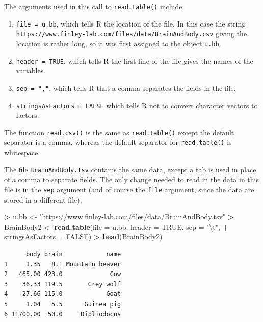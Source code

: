 \documentclass[
]{krantz}
\makeatletter
\newenvironment{Shaded}{\begin{snugshade}}{\end{snugshade}}
\newcommand{\CharTok}[1]{\textcolor[rgb]{0.5,0.5,0.5}{#1}}
\newcommand{\DataTypeTok}[1]{\textcolor[rgb]{0.27,0.27,0.27}{#1}}
\newcommand{\KeywordTok}[1]{\textcolor[rgb]{0.27,0.27,0.27}{\textbf{#1}}}
\newcommand{\NormalTok}[1]{#1}
\newcommand{\OperatorTok}[1]{\textcolor[rgb]{0.43,0.43,0.43}{\textbf{#1}}}
\newcommand{\OtherTok}[1]{\textcolor[rgb]{0.37,0.37,0.37}{#1}}
\newcommand{\StringTok}[1]{\textcolor[rgb]{0.5,0.5,0.5}{#1}}
\providecommand{\tightlist}{%
  \setlength{\itemsep}{0pt}\setlength{\parskip}{0pt}}
\newenvironment{kframe}{%
\medskip{}
\setlength{\fboxsep}{.8em}
 \def\at@end@of@kframe{}%
 \ifinner\ifhmode%
  \def\at@end@of@kframe{\end{minipage}}%
  \begin{minipage}{\columnwidth}%
 \fi\fi%
 \def\FrameCommand##1{\hskip\@totalleftmargin \hskip-\fboxsep
 \colorbox{shadecolor}{##1}\hskip-\fboxsep
     \hskip-\linewidth \hskip-\@totalleftmargin \hskip\columnwidth}%
 \MakeFramed {\advance\hsize-\width
   \@totalleftmargin\z@ \linewidth\hsize
   \@setminipage}}%
 {\par\unskip\endMakeFramed%
 \at@end@of@kframe}
\renewenvironment{Shaded}{\begin{kframe}}{\end{kframe}}
\makeatother
\begin{document}
The arguments used in this call to \texttt{read.table()} include:

\begin{enumerate}
\def\labelenumi{\arabic{enumi}.}
\tightlist
\item
  \texttt{file\ =\ u.bb}, which tells R the location of the file. In this case the string \texttt{https://www.finley-lab.com/files/data/BrainAndBody.csv} giving the location is rather long, so it was first assigned to the object \texttt{u.bb}.
\item
  \texttt{header\ =\ TRUE}, which tells R the first line of the file gives the names of the variables.
\item
  \texttt{sep\ =\ ","}, which tells R that a comma separates the fields in the file.
\item
  \texttt{stringsAsFactors\ =\ FALSE} which tells R not to convert character vectors to factors.
\end{enumerate}

The function \texttt{read.csv()} is the same as \texttt{read.table()} except the default separator is a comma, whereas the default separator for \texttt{read.table()} is whitespace.

The file \texttt{BrainAndBody.tsv} contains the same data, except a tab is used in place of a comma to separate fields. The only change needed to read in the data in this file is in the \texttt{sep} argument (and of course the \texttt{file} argument, since the data are stored in a different file):

\begin{Shaded}
\begin{Highlighting}[]
\OperatorTok{\textgreater{}}\StringTok{ }\NormalTok{u.bb \textless{}{-}}\StringTok{ "https://www.finley{-}lab.com/files/data/BrainAndBody.tsv"}
\OperatorTok{\textgreater{}}\StringTok{ }\NormalTok{BrainBody2 \textless{}{-}}\StringTok{ }\KeywordTok{read.table}\NormalTok{(}\DataTypeTok{file =}\NormalTok{ u.bb, }\DataTypeTok{header =} \OtherTok{TRUE}\NormalTok{, }\DataTypeTok{sep =} \StringTok{"}\CharTok{\textbackslash{}t}\StringTok{"}\NormalTok{, }
\OperatorTok{+}\StringTok{                          }\DataTypeTok{stringsAsFactors =} \OtherTok{FALSE}\NormalTok{)}
\OperatorTok{\textgreater{}}\StringTok{ }\KeywordTok{head}\NormalTok{(BrainBody2)}
\end{Highlighting}
\end{Shaded}

\begin{verbatim}
      body brain            name
1     1.35   8.1 Mountain beaver
2   465.00 423.0             Cow
3    36.33 119.5       Grey wolf
4    27.66 115.0            Goat
5     1.04   5.5      Guinea pig
6 11700.00  50.0     Dipliodocus
\end{verbatim}
\end{document}
